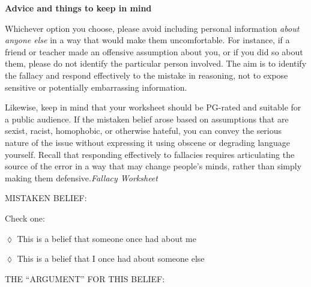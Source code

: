 \documentclass[oneside, openany]{book} %
\begin{document}
\noindent \textbf{Advice and things to keep in mind}

\noindent 

\noindent 

\noindent 

\noindent Whichever option you choose, please avoid including personal information \textit{about anyone else }in a way that would make them uncomfortable. For instance, if a friend or teacher made an offensive assumption about you, or if you did so about them, please do not identify the particular person involved. The aim is to identify the fallacy and respond effectively to the mistake in reasoning, not to expose sensitive or potentially embarrassing information.

\noindent Likewise, keep in mind that your worksheet should be PG-rated and suitable for a public audience. If the mistaken belief arose based on assumptions that are sexist, racist, homophobic, or otherwise hateful, you can convey the serious nature of the issue without expressing it using obscene or degrading language yourself. Recall that responding effectively to fallacies requires articulating the source of the error in a way that may change people's minds, rather than simply making them defensive.\textit{Fallacy Worksheet}

\noindent 

\noindent 

\noindent 

\noindent 

\noindent MISTAKEN BELIEF:

\noindent 

\noindent 

\noindent 

\noindent 

\noindent Check one:

\noindent 

\noindent $\mathrm{\lozenge}$ This is a belief that someone once had about me

\noindent 

\noindent $\mathrm{\lozenge}$ This is a belief that I once had about someone else

\noindent 

\noindent 

\noindent 

\noindent 

\noindent THE ``ARGUMENT'' FOR THIS BELIEF:

\noindent 

\noindent 
\end{document}
